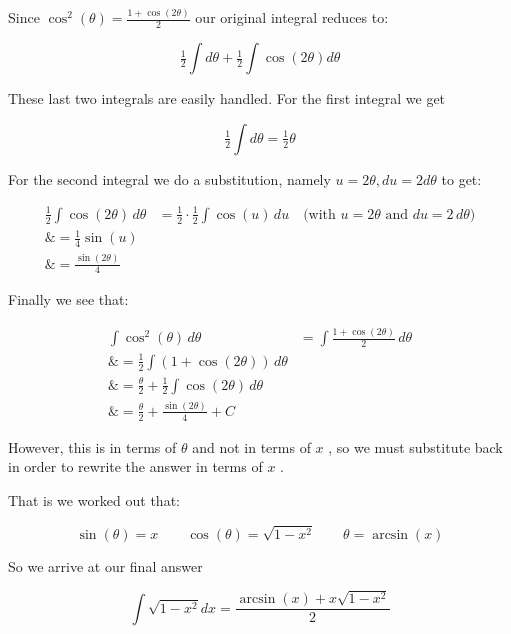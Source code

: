 Since $\cos^2(\theta)=\frac{1+\cos(2\theta)}{2}$ our original integral reduces to:



$$\tfrac12\int d\theta+\tfrac12\int\cos(2\theta)d\theta$$



These last two integrals are easily handled. For the first integral we get



$$\tfrac12\int d\theta=\tfrac12\theta$$



For the second integral we do a substitution, namely $u=2\theta,du=2d\theta$ to get:



\begin{align}
\tfrac{1}{2}\int\cos(2\theta)\,d\theta &= \tfrac{1}{2}\cdot\tfrac{1}{2}\int\cos(u)\,du \quad \text{(with } u = 2\theta \text{ and } du = 2\,d\theta\text{)} \\\&= \tfrac{1}{4}\sin(u) \\\&= \frac{\sin(2\theta)}{4}
\end{align}





Finally we see that:



\begin{align}
\int \cos^2(\theta)\,d\theta &= \int \frac{1 + \cos(2\theta)}{2}\,d\theta \\\&= \frac{1}{2}\int (1 + \cos(2\theta))\,d\theta \\\&= \frac{\theta}{2} + \frac{1}{2}\int \cos(2\theta)\,d\theta \\\&= \frac{\theta}{2} + \frac{\sin(2\theta)}{4} + C
\end{align}



However, this is in terms of $\theta$ and not in terms of $x$ , so we must substitute back in order to rewrite the answer in terms of $x$ .



That is we worked out that:



$$\sin(\theta)=x\qquad\cos(\theta)=\sqrt{1-x^2}\qquad\theta=\arcsin(x)$$



So we arrive at our final answer



$$\int\sqrt{1-x^2}dx=\frac{\arcsin(x)+x\sqrt{1-x^2}}{2}$$



